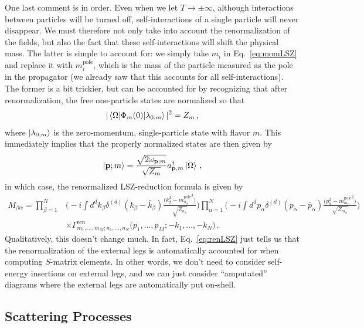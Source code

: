 \documentclass{article}
\numberwithin{equation}{subsection}
\begin{document}
One last comment is in order. Even when we let $T\to\pm\infty$, although interactions between particles will be turned off, self-interactions of
a single particle will never disappear. We must therefore not only take into account the renormalization of the fields, but also the fact that
these self-interactions will shift the physical mass. The latter is simple to account for: we simply take $m_i$ in Eq.~\eqref{eq:momLSZ} and
replace it with $m_i^{\text{pole}}$, which is the mass of the particle measured as the pole in the propagator (we already saw that this
accounts for all self-interactions). The former is a bit trickier, but can be accounted for by recognizing that after renormalization, the free one-particle
states are normalized so that
\begin{equation}
	|\mel{\Omega}{\Phi_m(0)}{\lambda_{0,m}}|^2 = Z_m\,,
\end{equation}
where $\ket{\lambda_{0,m}}$ is the zero-momentum, single-particle state with flavor $m$. This immediately implies that the properly normalized states are
then given by
\begin{equation}
	\ket{\mathbf{p};m} = \frac{\sqrt{2\omega_{\mathbf{p};m}}}{\sqrt{Z_m}}a^\dag_{\mathbf{p},m}\ket{\Omega}\,,
\end{equation}
in which case, the renormalized LSZ-reduction formula is given by
\begin{equation}\begin{split}\label{eq:renLSZ}
	M_{\beta\alpha} = \prod_{\beta = 1}^N&\Bigg(-i\int d^d k_\beta \delta^{(d)}(k_\beta - \bar{k}_\beta)\frac{\big(k_\beta^2 - {m^{\text{pole}}_{n_\beta}}^2\big)}{\sqrt{Z_{n_\beta}}}\Bigg)
		\prod_{\alpha = 1}^N\Bigg(-i\int d^d p_\alpha \delta^{(d)}(p_\alpha - \bar{p}_\alpha)\frac{\big(p_\alpha^2 - {m^{\text{pole}}_{m_\alpha}}^2\big)}{\sqrt{Z_{m_\alpha}}}\Bigg)\\[0.5em]
		&\times \Gamma_{m_1,\dots,m_M;n_1,\dots,n_N}^{\text{ren}}\big(p_1,\dots,p_M;-k_1,\dots,-k_N\big)\,.
\end{split}\end{equation}
Qualitatively, this doesn't change much. In fact, Eq.~\eqref{eq:renLSZ} just tells us that the renormalization of the external legs is automatically accounted for when computing
$S$-matrix elements. In other words, we don't need to consider self-energy insertions on external legs, and we can just consider ``amputated'' diagrams where the 
external legs are automatically put on-shell.

\subsection{Scattering Processes}
\end{document}
